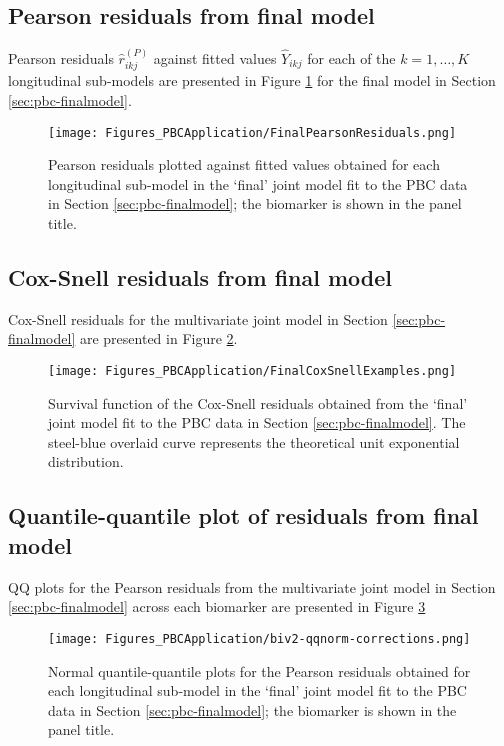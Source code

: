 \subsection{Pearson residuals from final model}\label{sec:appendix-suppfigs-finalpearson}
Pearson residuals $\hat{r}_{ikj}^{(P)}$ against fitted values $\hat{Y}_{ikj}$ for each of the $k=1,\dots,K$ longitudinal sub-models are presented in Figure \ref{fig:appendix-suppfigs-finalpearson} for the final model in Section \ref{sec:pbc-finalmodel}.
\begin{figure}[ht]
    \centering
    \texttt{[image: Figures\_PBCApplication/FinalPearsonResiduals.png]}
    \caption{Pearson residuals plotted against fitted values obtained for each longitudinal sub-model in the `final' joint model fit to the PBC data in Section \ref{sec:pbc-finalmodel}; the biomarker is shown in the panel title.}
    \label{fig:appendix-suppfigs-finalpearson}
\end{figure}

\subsection{Cox-Snell residuals from final model}\label{sec:appendix-suppfigs-finalcoxsnell}
Cox-Snell residuals for the multivariate joint model in Section \ref{sec:pbc-finalmodel} are presented in Figure \ref{fig:appendix-suppfigs-finalcoxsnell}. 
\begin{figure}[ht]
    \centering
    \texttt{[image: Figures\_PBCApplication/FinalCoxSnellExamples.png]}
    \caption{Survival function of the Cox-Snell residuals obtained from the `final' joint model fit to the PBC data in Section \ref{sec:pbc-finalmodel}. The steel-blue overlaid curve represents the theoretical unit exponential distribution.}
    \label{fig:appendix-suppfigs-finalcoxsnell}
\end{figure}

\subsection{Quantile-quantile plot of residuals from final model}\label{sec:appendix-suppfigs-finalQQresid}
QQ plots for the Pearson residuals from the multivariate joint model in Section \ref{sec:pbc-finalmodel} across each biomarker are presented in Figure \ref{fig:appendix-suppfigs-finalQQresid}
\begin{figure}[ht]
    \centering
    \texttt{[image: Figures\_PBCApplication/biv2-qqnorm-corrections.png]}
    \caption{Normal quantile-quantile plots for the Pearson residuals obtained for each longitudinal sub-model in the `final' joint model fit to the PBC data in Section \ref{sec:pbc-finalmodel}; the biomarker is shown in the panel title.}
    \label{fig:appendix-suppfigs-finalQQresid}
\end{figure}

